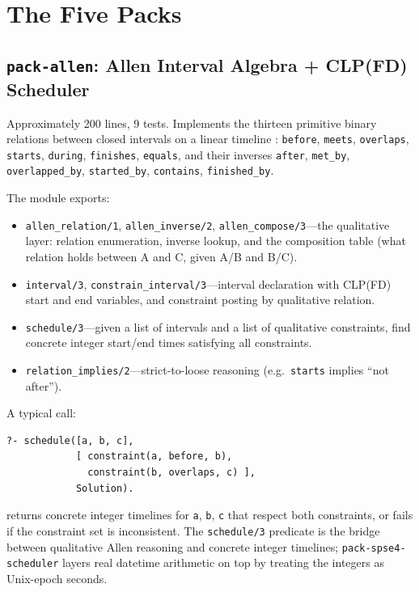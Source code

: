 \documentclass[11pt,letterpaper]{article}
\begin{document}
\section{The Five Packs}
\label{sec:packs}

\subsection{\texttt{pack-allen}: Allen Interval Algebra + CLP(FD) Scheduler}
\label{sec:allen}

Approximately 200 lines, 9 tests. Implements the thirteen primitive binary
relations between closed intervals on a linear timeline \citep{allen-1983}: \texttt{before},
\texttt{meets}, \texttt{overlaps}, \texttt{starts}, \texttt{during},
\texttt{finishes}, \texttt{equals}, and their inverses \texttt{after},
\texttt{met\_by}, \texttt{overlapped\_by}, \texttt{started\_by},
\texttt{contains}, \texttt{finished\_by}.

The module exports:

\begin{itemize}
\item \texttt{allen\_relation/1}, \texttt{allen\_inverse/2},
  \texttt{allen\_compose/3}---the qualitative layer: relation enumeration,
  inverse lookup, and the composition table (what relation holds between
  A and C, given A/B and B/C).
\item \texttt{interval/3}, \texttt{constrain\_interval/3}---interval
  declaration with CLP(FD) start and end variables, and constraint posting
  by qualitative relation.
\item \texttt{schedule/3}---given a list of intervals and a list of
  qualitative constraints, find concrete integer start/end times
  satisfying all constraints.
\item \texttt{relation\_implies/2}---strict-to-loose reasoning (e.g.\
  \texttt{starts} implies ``not after'').
\end{itemize}

A typical call:

\begin{lstlisting}
?- schedule([a, b, c],
            [ constraint(a, before, b),
              constraint(b, overlaps, c) ],
            Solution).
\end{lstlisting}

returns concrete integer timelines for \texttt{a}, \texttt{b}, \texttt{c}
that respect both constraints, or fails if the constraint set is
inconsistent. The \texttt{schedule/3} predicate is the bridge between
qualitative Allen reasoning and concrete integer timelines;
\texttt{pack-spse4-scheduler} layers real datetime arithmetic on top by
treating the integers as Unix-epoch seconds.
\end{document}

